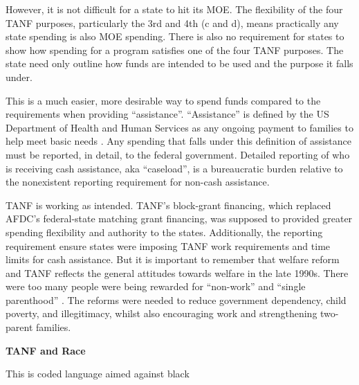 \documentclass[12pt,letterpaperpaper,]{book}
\begin{document}
However, it is not difficult for a state to hit its MOE. The flexibility
of the four TANF purposes, particularly the 3rd and 4th (c and d), means
practically any state spending is also MOE spending. There is also no
requirement for states to show how spending for a program satisfies one
of the four TANF purposes. The state need only outline how funds are
intended to be used and the purpose it falls under.

This is a much easier, more desirable way to spend funds compared to the
requirements when providing ``assistance''. ``Assistance'' is defined by
the US Department of Health and Human Services as any ongoing payment to
families to help meet basic needs \citep{falk_temporary_2016}. Any
spending that falls under this definition of assistance must be
reported, in detail, to the federal government. Detailed reporting of
who is receiving cash assistance, aka ``caseload'', is a bureaucratic
burden relative to the nonexistent reporting requirement for non-cash
assistance.

TANF is working as intended. TANF's block-grant financing, which
replaced AFDC's federal-state matching grant financing, was supposed to
provided greater spending flexibility and authority to the states.
Additionally, the reporting requirement ensure states were imposing TANF
work requirements and time limits for cash assistance. But it is
important to remember that welfare reform and TANF reflects the general
attitudes towards welfare in the late 1990s. There were too many people
were being rewarded for ``non-work'' and ``single parenthood''
\citep{rector_continuing_2003}. The reforms were needed to reduce
government dependency, child poverty, and illegitimacy, whilst also
encouraging work and strengthening two-parent families.

\textbf{TANF and Race}

This is coded language aimed against black
\end{document}
